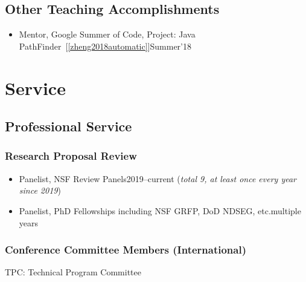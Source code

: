 \documentclass[11pt]{article}
\begin{document}
\subsection{Other Teaching Accomplishments}
\begin{itemize}
    \item Mentor, Google Summer of Code, Project: Java PathFinder~[\ref{zheng2018automatic}]\hfill Summer'18
\end{itemize}

\section{Service}
\subsection{Professional Service}

\subsubsection{Research Proposal Review}
\begin{itemize}
    \item Panelist, NSF Review Panels\hfill 2019--current (\emph{total 9, at least once every year since 2019})
    \item Panelist, PhD Fellowships including NSF GRFP, DoD NDSEG, etc.\hfill multiple years
\end{itemize}

\subsubsection{Conference Committee Members (International)}

\begin{description}[before=\small]
    \item TPC: Technical Program Committee
\end{description}
\end{document}
